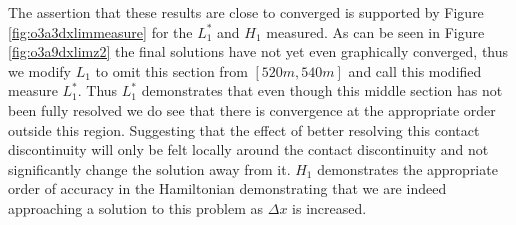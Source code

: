 \documentclass[SingleSpace,12pt,Proceedings]{Serre_ASCE}
\begin{document}
The assertion that these results are close to converged is supported by Figure \ref{fig:o3a3dxlimmeasure} for the $L^*_1$ and $H_1$ measured. As can be seen in Figure \ref{fig:o3a9dxlimz2} the final solutions have not yet even graphically converged, thus we modify $L_1$ to omit this section from $[520m,540m]$ and call this modified measure $L^*_1$. Thus $L^*_1$ demonstrates that even though this middle section has not been fully resolved we do see that there is convergence at the appropriate order outside this region. Suggesting that the effect of better resolving this contact discontinuity will only be felt locally around the contact discontinuity and not significantly change the solution away from it. $H_1$ demonstrates the appropriate order of accuracy in the Hamiltonian demonstrating that we are indeed approaching a solution to this problem as $\Delta x$ is increased. 
\end{document}
